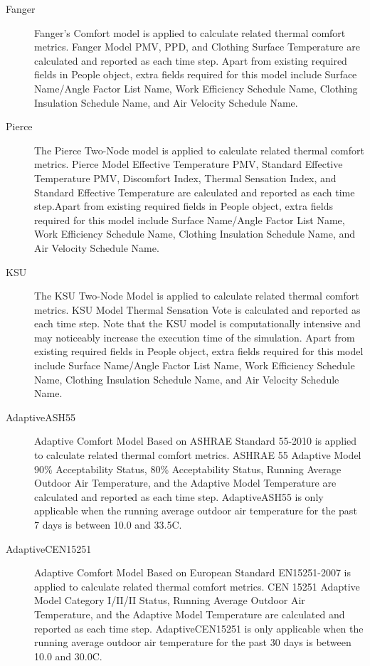 \begin{description}
  \item[Fanger] 
  Fanger’s Comfort model is applied to calculate related thermal comfort metrics. Fanger Model PMV, PPD, and Clothing Surface Temperature are calculated and reported as each time step. Apart from existing required fields in People object, extra fields required for this model include Surface Name/Angle Factor List Name, Work Efficiency Schedule Name, Clothing Insulation Schedule Name, and Air Velocity Schedule Name.

  \item[Pierce] 
  The Pierce Two-Node model is applied to calculate related thermal comfort metrics. Pierce Model Effective Temperature PMV, Standard Effective Temperature PMV, Discomfort Index, Thermal Sensation Index, and Standard Effective Temperature are calculated and reported as each time step.Apart from existing required fields in People object, extra fields required for this model include Surface Name/Angle Factor List Name, Work Efficiency Schedule Name, Clothing Insulation Schedule Name, and Air Velocity Schedule Name.

  \item[KSU] 
  The KSU Two-Node Model is applied to calculate related thermal comfort metrics. KSU Model Thermal Sensation Vote is calculated and reported as each time step. Note that the KSU model is computationally intensive and may noticeably increase the execution time of the simulation. Apart from existing required fields in People object, extra fields required for this model include Surface Name/Angle Factor List Name, Work Efficiency Schedule Name, Clothing Insulation Schedule Name, and Air Velocity Schedule Name.

  \item[AdaptiveASH55] 
  Adaptive Comfort Model Based on ASHRAE Standard 55-2010 is applied to calculate related thermal comfort metrics. ASHRAE 55 Adaptive Model 90\% Acceptability Status, 80\% Acceptability Status, Running Average Outdoor Air Temperature, and the Adaptive Model Temperature are calculated and reported as each time step. AdaptiveASH55 is only applicable when the running average outdoor air temperature for the past 7 days is between 10.0 and 33.5C.

  \item[AdaptiveCEN15251] 
  Adaptive Comfort Model Based on European Standard EN15251-2007 is applied to calculate related thermal comfort metrics. CEN 15251 Adaptive Model Category I/II/II Status, Running Average Outdoor Air Temperature, and the Adaptive Model Temperature are calculated and reported as each time step. AdaptiveCEN15251 is only applicable when the running average outdoor air temperature for the past 30 days is between 10.0 and 30.0C.


\end{description}
